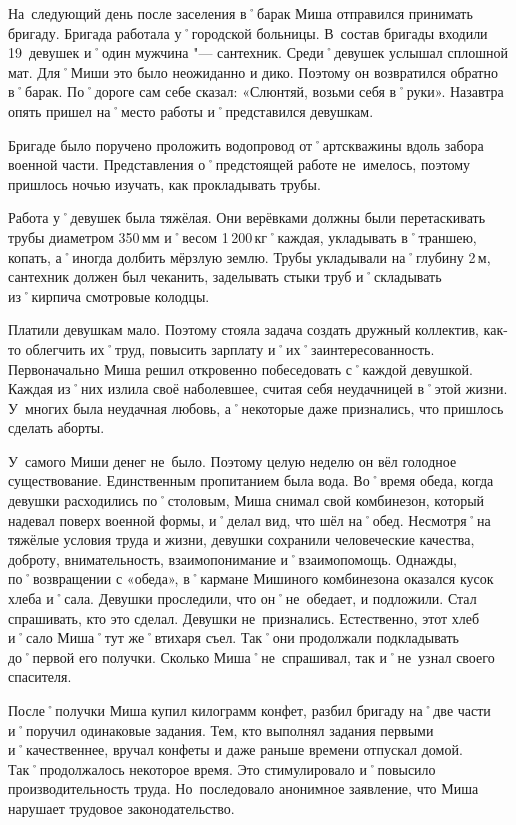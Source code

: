 На~следующий день после заселения в˚барак Миша отправился принимать бригаду. Бригада работала у˚городской больницы. В~состав бригады входили 19~девушек и˚один мужчина "--- сантехник. Среди˚девушек услышал сплошной мат. Для˚Миши это было неожиданно и дико. Поэтому он возвратился обратно в˚барак. По˚дороге сам себе сказал: «Слюнтяй, возьми себя в˚руки». Назавтра опять пришел на˚место работы и˚представился девушкам.

Бригаде было поручено проложить водопровод от˚артскважины вдоль забора военной части. Представления о˚предстоящей работе не~имелось, поэтому пришлось ночью изучать, как прокладывать трубы.

Работа у˚девушек была тяжёлая. Они верёвками должны были перетаскивать трубы диаметром 350\,мм и˚весом 1\,200\,кг˚каждая, укладывать в˚траншею, копать, а˚иногда долбить мёрзлую землю. Трубы укладывали на˚глубину 2\,м, сантехник должен был чеканить, заделывать стыки труб и˚складывать из˚кирпича смотровые колодцы.

Платили девушкам мало. Поэтому стояла задача создать дружный коллектив, как-то облегчить их˚труд, повысить зарплату и˚их˚заинтересованность. Первоначально Миша решил откровенно побеседовать с˚каждой девушкой. Каждая из˚них излила своё наболевшее, считая себя неудачницей в˚этой жизни. У~многих была неудачная любовь, а˚некоторые даже признались, что пришлось сделать аборты.

У~самого Миши денег не~было. Поэтому целую неделю он вёл голодное существование. Единственным пропитанием была вода. Во˚время обеда, когда девушки расходились по˚столовым, Миша снимал свой комбинезон, который надевал поверх военной формы, и˚делал вид, что шёл на˚обед. Несмотря˚на тяжёлые условия труда и жизни, девушки сохранили человеческие качества, доброту, внимательность, взаимопонимание и˚взаимопомощь. Однажды, по˚возвращении с «обеда», в˚кармане Мишиного комбинезона оказался кусок хлеба и˚сала. Девушки проследили, что он˚не~обедает, и подложили. Стал спрашивать, кто это сделал. Девушки не~признались. Естественно, этот хлеб и˚сало Миша˚тут же˚втихаря съел. Так˚они продолжали подкладывать до˚первой его получки. Сколько Миша˚не~спрашивал, так и˚не~узнал своего спасителя.

После˚получки Миша купил килограмм конфет, разбил бригаду на˚две части и˚поручил одинаковые задания. Тем, кто выполнял задания первыми и˚качественнее, вручал конфеты и даже раньше времени отпускал домой. Так˚продолжалось некоторое время. Это стимулировало и˚повысило производительность труда. Но~последовало анонимное заявление, что Миша нарушает трудовое законодательство.

